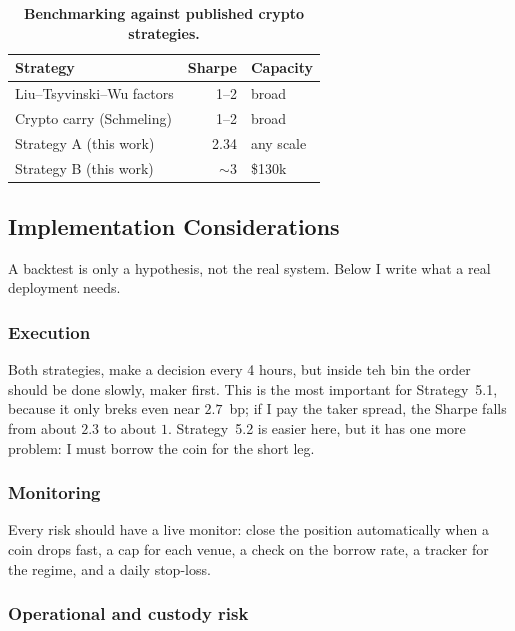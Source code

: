 \documentclass[10pt,twocolumn,a4paper]{article}
\begin{document}
\begin{table}[H]
  \centering
  \caption{\textbf{Benchmarking against published crypto strategies.}}
  \label{tab:bench}
  \begin{tabular}{lrl}
    \toprule
    \textbf{Strategy} & \textbf{Sharpe} & \textbf{Capacity} \\
    \midrule
    Liu--Tsyvinski--Wu factors  & 1--2  & broad \\
    Crypto carry (Schmeling)    & 1--2  & broad \\
    Strategy A (this work)      & 2.34  & any scale \\
    Strategy B (this work)      & $\sim$3 & \$130k \\
    \bottomrule
  \end{tabular}
\end{table}


\subsection{Implementation Considerations}
\label{sec:impl}

A backtest is only a hypothesis, not the real system.  Below I write what a real
deployment needs.

\subsubsection{Execution}

Both strategies, make a decision every 4 hours, but inside teh bin the order should be
done slowly, maker first.  This is the most important for Strategy~5.1, because it only
breks even near $2.7$~bp; if I pay the taker spread, the Sharpe falls from about
$2.3$ to about $1$.  Strategy~5.2 is easier here, but it has one more problem: I must
borrow the coin for the short leg.

\subsubsection{Monitoring}

Every risk should have a live monitor: close the position automatically when a coin
drops fast, a cap for each venue, a check on the borrow rate, a tracker for the
regime, and a daily stop-loss.

\subsubsection{Operational and custody risk}
\end{document}
